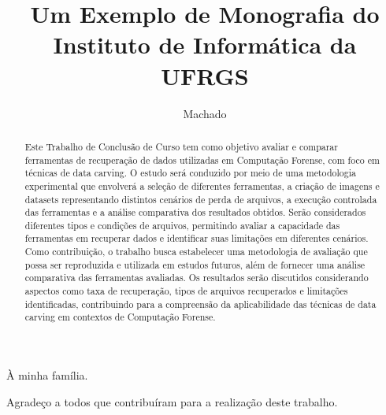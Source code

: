 \documentclass[cic,diss,portuguese]{infufrgs}
\title{Um Exemplo de Monografia do Instituto de Informática da UFRGS}
\author{Machado}{Lucas C.}
\begin{document}

\maketitle

\begin{dedicatoria}
  À minha família.
\end{dedicatoria}

\begin{agradecimentos}
  Agradeço a todos que contribuíram para a realização deste trabalho.
\end{agradecimentos}

\begin{abstract}
Este Trabalho de Conclusão de Curso tem como objetivo avaliar e comparar ferramentas de recuperação de dados utilizadas em Computação Forense, com foco em técnicas de data carving. O estudo será conduzido por meio de uma metodologia experimental que envolverá a seleção de diferentes ferramentas, a criação de imagens e datasets representando distintos cenários de perda de arquivos, a execução controlada das ferramentas e a análise comparativa dos resultados obtidos. Serão considerados diferentes tipos e condições de arquivos, permitindo avaliar a capacidade das ferramentas em recuperar dados e identificar suas limitações em diferentes cenários. Como contribuição, o trabalho busca estabelecer uma metodologia de avaliação que possa ser reproduzida e utilizada em estudos futuros, além de fornecer uma análise comparativa das ferramentas avaliadas. Os resultados serão discutidos considerando aspectos como taxa de recuperação, tipos de arquivos recuperados e limitações identificadas, contribuindo para a compreensão da aplicabilidade das técnicas de data carving em contextos de Computação Forense.
\end{abstract}
\end{document}
